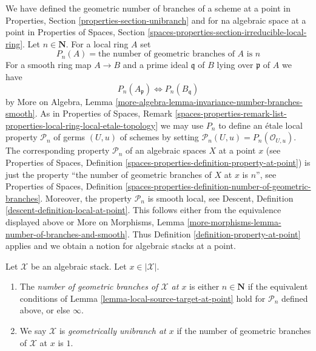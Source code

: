\noindent
We have defined the geometric number of branches of a scheme at a point
in Properties, Section \ref{properties-section-unibranch}
and for na algebraic space at a point in Properties of Spaces, Section
\ref{spaces-properties-section-irreducible-local-ring}.
Let $n \in \mathbf{N}$. For a local ring $A$ set
$$
P_n(A) = \text{the number of geometric branches of }A\text{ is }n
$$
For a smooth ring map $A \to B$ and a prime ideal $\mathfrak q$
of $B$ lying over $\mathfrak p$ of $A$ we have
$$
P_n(A_\mathfrak p) \Leftrightarrow P_n(B_\mathfrak q)
$$
by More on Algebra, Lemma
\ref{more-algebra-lemma-invariance-number-branches-smooth}.
As in Properties of Spaces, Remark
\ref{spaces-properties-remark-list-properties-local-ring-local-etale-topology}
we may use $P_n$ to define an \'etale local property $\mathcal{P}_n$
of germs $(U, u)$ of schemes by setting
$\mathcal{P}_n(U, u) = P_n(\mathcal{O}_{U, u})$.
The corresponding property $\mathcal{P}_n$
of an algebraic spaces $X$ at a point $x$
(see Properties of Spaces, Definition
\ref{spaces-properties-definition-property-at-point})
is just the property
``the number of geometric branches of $X$ at $x$ is $n$'', see
Properties of Spaces, Definition
\ref{spaces-properties-definition-number-of-geometric-branches}.
Moreover, the property $\mathcal{P}_n$ is smooth local, see
Descent, Definition \ref{descent-definition-local-at-point}.
This follows either from the equivalence displayed above
or More on Morphisms, Lemma
\ref{more-morphisms-lemma-number-of-branches-and-smooth}.
Thus Definition \ref{definition-property-at-point}
applies and we obtain a notion for algebraic stacks at a point.

\begin{definition}
\label{definition-number-of-geometric-branches}
Let $\mathcal{X}$ be an algebraic stack. Let $x \in |\mathcal{X}|$.
\begin{enumerate}
\item The {\it number of geometric branches of $\mathcal{X}$ at $x$}
is either $n \in \mathbf{N}$ if the equivalent conditions of
Lemma \ref{lemma-local-source-target-at-point} hold for
$\mathcal{P}_n$ defined above, or else $\infty$.
\item We say $\mathcal{X}$ is {\it geometrically unibranch at $x$}
if the number of geometric branches of $\mathcal{X}$ at $x$ is $1$.
\end{enumerate}
\end{definition}












